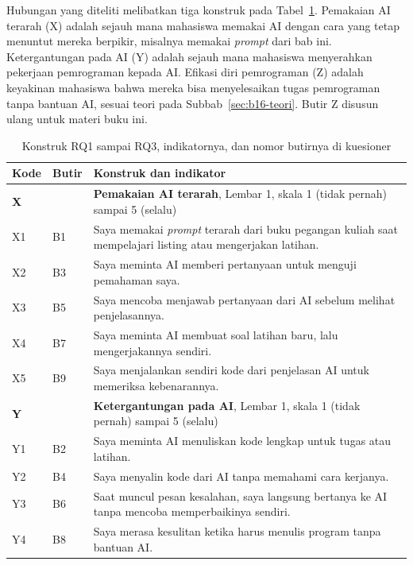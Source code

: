 Hubungan yang diteliti melibatkan tiga konstruk pada Tabel~\ref{tab:b16-konstruk}. Pemakaian AI terarah (X) adalah sejauh mana mahasiswa memakai AI dengan cara yang tetap menuntut mereka berpikir, misalnya memakai \textit{prompt} dari bab ini. Ketergantungan pada AI (Y) adalah sejauh mana mahasiswa menyerahkan pekerjaan pemrograman kepada AI. Efikasi diri pemrograman (Z) adalah keyakinan mahasiswa bahwa mereka bisa menyelesaikan tugas pemrograman tanpa bantuan AI, sesuai teori pada Subbab~\ref{sec:b16-teori}. Butir Z disusun ulang untuk materi buku ini.

\begin{table}[H]
  \centering
  \caption{Konstruk RQ1 sampai RQ3, indikatornya, dan nomor butirnya di kuesioner}
  \label{tab:b16-konstruk}
  \begin{tabularx}{\textwidth}{llX}
    \hline
    \textbf{Kode} & \textbf{Butir} & \textbf{Konstruk dan indikator} \\
    \hline
    \textbf{X} & & \textbf{Pemakaian AI terarah}, Lembar 1, skala 1 (tidak pernah) sampai 5 (selalu) \\
    \hline
    X1 & B1 & Saya memakai \textit{prompt} terarah dari buku pegangan kuliah saat mempelajari listing atau mengerjakan latihan. \\
    \hline
    X2 & B3 & Saya meminta AI memberi pertanyaan untuk menguji pemahaman saya. \\
    \hline
    X3 & B5 & Saya mencoba menjawab pertanyaan dari AI sebelum melihat penjelasannya. \\
    \hline
    X4 & B7 & Saya meminta AI membuat soal latihan baru, lalu mengerjakannya sendiri. \\
    \hline
    X5 & B9 & Saya menjalankan sendiri kode dari penjelasan AI untuk memeriksa kebenarannya. \\
    \hline
    \textbf{Y} & & \textbf{Ketergantungan pada AI}, Lembar 1, skala 1 (tidak pernah) sampai 5 (selalu) \\
    \hline
    Y1 & B2 & Saya meminta AI menuliskan kode lengkap untuk tugas atau latihan. \\
    \hline
    Y2 & B4 & Saya menyalin kode dari AI tanpa memahami cara kerjanya. \\
    \hline
    Y3 & B6 & Saat muncul pesan kesalahan, saya langsung bertanya ke AI tanpa mencoba memperbaikinya sendiri. \\
    \hline
    Y4 & B8 & Saya merasa kesulitan ketika harus menulis program tanpa bantuan AI. \\

\end{tabularx}
\end{table}
